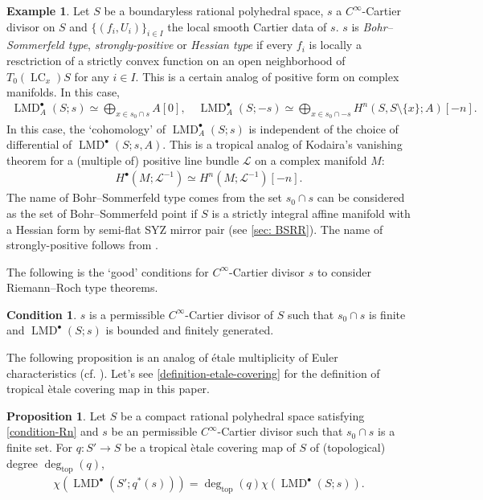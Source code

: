 \documentclass[a4paper,dvipdfmx,reqno,12pt]{amsart}
\theoremstyle{definition}
\newtheorem{example}[theorem]{Example}
\newtheorem{proposition}[theorem]{Proposition}
\newtheorem{condition}[theorem]{Condition}
\newcommand{\mcal}[1]{\mathcal{#1}}%
\newcommand{\opn}[1]{\operatorname{#1}}
\numberwithin{equation}{section}
\begin{document}
\begin{example}
\label{example-tropical-kodaira-vanishing}
Let $S$ be a boundaryless rational polyhedral space, 
$s$ a $C^{\infty}$-Cartier divisor on $S$ 
and $\{(f_i,U_i)\}_{i\in I}$ the local smooth 
Cartier data of $s$. 
$s$ is 
\emph{Bohr--Sommerfeld type},
\emph{strongly-positive}
or \emph{Hessian type} if every
$f_i$ is locally a resctriction of a strictly convex 
function on an open neighborhood of $T_0(\opn{LC}_x)S$ 
for any $i\in I$. 
This is a certain analog of positive form on
complex manifolds. In this case, 
\begin{align}
\opn{LMD}^{\bullet}_{A}(S;s)\simeq 
\bigoplus_{x\in s_0 \cap s} A[0], \quad
\opn{LMD}^{\bullet}_{A}(S;-s)\simeq 
\bigoplus_{x\in s_0\cap -s} 
H^{n}(S,S\setminus\{x\};A)[-n].
\end{align}
In this case, the `cohomology' of 
$\opn{LMD}^{\bullet}_{A}(S;s)$ is independent of the choice of 
differential of $\opn{LMD}^{\bullet}(S;s,A)$.
This is a tropical analog of Kodaira's vanishing theorem
for a (multiple of) positive line bundle
$\mathcal{L}$ on a complex manifold $M$: 
\begin{align}
H^{\bullet}(M;\mcal{L}^{-1})\simeq H^{n}(M;\mcal{L}^{-1})[-n].
\end{align}
The name of Bohr--Sommerfeld type comes from 
the set $s_0\cap s$ can be considered as the set of 
Bohr--Sommerfeld point if $S$ is a strictly integral affine manifold 
with a Hessian form by semi-flat SYZ mirror pair
(see \cref{sec: BSRR}).
The name of strongly-positive follows 
from \cite{MR2892935}.
\end{example}

The following is the `good' conditions for 
$C^{\infty}$-Cartier divisor 
$s$ to consider Riemann--Roch type theorems.

\begin{condition}
\label{condition-good-divisor}
$s$ is a permissible $C^{\infty}$-Cartier divisor of 
$S$ such that $s_0\cap s$ is finite and 
$\opn{LMD}^{\bullet}(S;s)$ is bounded and 
finitely generated.
\end{condition}

The following proposition is an analog of \'{e}tale multiplicity of Euler characteristics
(cf. \cite[Proposition 1.1.28]{MR2095471}).
Let's see \cref{definition-etale-covering} for 
the definition of tropical \`etale covering 
map in this paper.
\begin{proposition}
\label{proposition-euler-number-etale}
Let $S$ be a compact rational polyhedral space satisfying
\cref{condition-Rn} and $s$ be an permissible 
$C^{\infty}$-Cartier divisor
such that $s_0\cap s$ is a finite set.
For $q \colon S' \to S$ be a tropical \`etale covering 
map of $S$ of 
(topological) degree 
$\opn{deg}_{\opn{top}}(q)$,
\begin{align}
\chi(\opn{LMD}^{\bullet}(S';q^{*}(s)))=
\opn{deg}_{\opn{top}}(q)\chi(\opn{LMD}^{\bullet}(S;s)).
\end{align}
\end{proposition}
\end{document}
